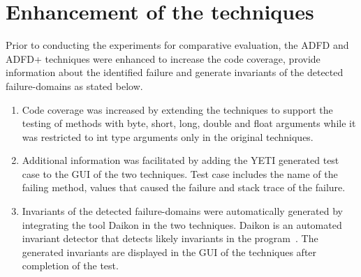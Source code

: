 \documentclass[runningheads,a4paper]{llncs}
\begin{document}


\section{Enhancement of the techniques}
Prior to conducting the experiments for comparative evaluation, the ADFD and ADFD+ techniques were enhanced to increase the code coverage, provide information about the identified failure and generate invariants of the detected failure-domains as stated below.
\begin{enumerate}

\item Code coverage was increased by extending the techniques to support the testing of methods with byte, short, long, double and float arguments while it was restricted to int type arguments only in the original techniques.

\item Additional information was facilitated by adding the YETI generated test case to the GUI of the two techniques. Test case includes the name of the failing method, values that caused the failure and stack trace of the failure.

\item Invariants of the detected failure-domains were automatically generated by integrating the tool Daikon in the two techniques. Daikon is an automated invariant detector that detects likely invariants in the program~\cite{ernst2007daikon}. The generated invariants are displayed in the GUI of the techniques after completion of the test. 

\end{enumerate}
\end{document}
